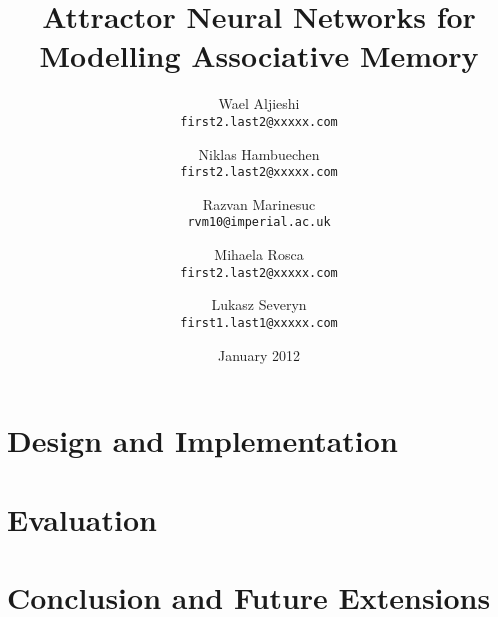 \documentclass[11pt,a4paper,oneside]{report}
\title{Attractor Neural Networks for Modelling Associative Memory}
\date{January 2012}
\author{
  Wael Aljieshi\\
  \texttt{first2.last2@xxxxx.com}
  \and
  Niklas Hambuechen\\
  \texttt{first2.last2@xxxxx.com}
  \and
  Razvan Marinesuc\\
  \texttt{rvm10@imperial.ac.uk}
  \and
  Mihaela Rosca\\
  \texttt{first2.last2@xxxxx.com}
  \and
  Lukasz Severyn\\
  \texttt{first1.last1@xxxxx.com}
}
\begin{document}







\maketitle{}


\renewcommand{\abstractname}{Executive Summary}



\tableofcontents





\chapter{Design and Implementation}



\chapter{Evaluation}




\chapter{Conclusion and Future Extensions}
\end{document}
